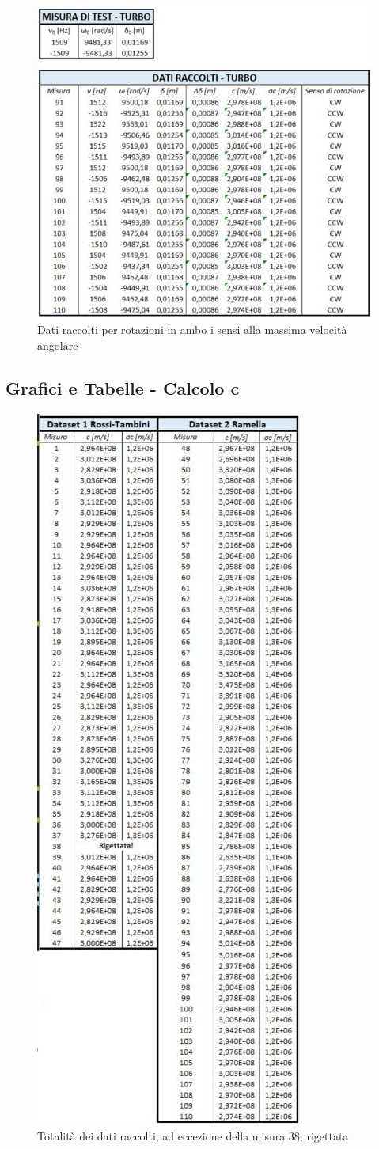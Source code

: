 \documentclass{article}
\begin{document}
\begin{figure}[h]
    \centering
    \includegraphics[width=0.6\linewidth]{RAM_TURBO.JPG}
    \caption{Dati raccolti per rotazioni in ambo i sensi alla massima velocità angolare}
    \label{RAM_TURBO}
\end{figure}

\FloatBarrier

\subsection{Grafici e Tabelle - Calcolo c} \label{C}

\begin{figure}[h!]
    \centering
    \includegraphics[width=0.47\linewidth]{Dati_Completi.JPG}
    \caption{Totalità dei dati raccolti, ad eccezione della misura 38, rigettata}
    \label{Dati_Completi}
\end{figure}
\end{document}
